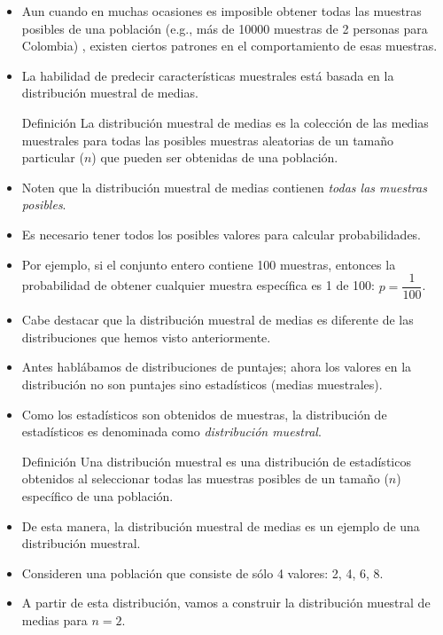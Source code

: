 \documentclass{beamer}
\begin{document}
\begin{frame}
	\begin{itemize}
		\justifying
		\item Aun cuando en muchas ocasiones es imposible obtener todas las muestras posibles de una población (e.g., más de 10000 muestras de 2 personas para Colombia) , existen ciertos patrones en el comportamiento de esas muestras.
		\item La habilidad de predecir características 	muestrales está basada en la distribución muestral de medias.
		\begin{block}{Definición}
			\justifying
			La distribución muestral de medias es la colección de las medias muestrales para todas las posibles muestras aleatorias de un tamaño particular ($n$) que pueden ser obtenidas de una población.
		\end{block}
	\end{itemize}
\end{frame}

\begin{frame}
	\begin{itemize}
		\justifying
		\item Noten que la distribución muestral de medias contienen \emph{todas las muestras posibles}.
		\item Es necesario tener todos los posibles valores para calcular probabilidades.
		\item Por ejemplo, si el conjunto entero contiene 100 muestras, entonces la probabilidad de obtener cualquier muestra específica  es 1 de 100: $p=\dfrac{1}{100}$.
		\item Cabe destacar que la distribución muestral de medias es diferente de las distribuciones que hemos visto anteriormente.
		\item Antes hablábamos de distribuciones de puntajes; ahora los valores en la distribución no son puntajes sino estadísticos (medias muestrales).
	\end{itemize}
\end{frame}

\begin{frame}
	\begin{itemize}
		\justifying
		\item Como los estadísticos son obtenidos de muestras, la distribución de estadísticos  es denominada como \emph{distribución muestral}.	
		\begin{block}{Definición}
			\justifying
			Una distribución muestral es una distribución de estadísticos obtenidos al seleccionar todas las muestras posibles de un tamaño ($n$) específico de una población.
		\end{block}
		\item De esta manera, la distribución muestral de medias es un ejemplo de una distribución muestral.
		\item Consideren una población que consiste de sólo 4 valores: 2, 4, 6, 8.
		\item A partir de esta distribución, vamos a construir la distribución muestral de medias para $n=2$.
	\end{itemize}
\end{frame}
\end{document}
